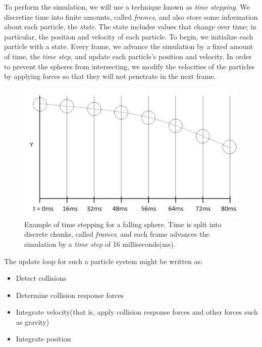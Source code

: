 \documentclass[]{article}
\begin{document}
	To perform the simulation, we will use a technique known as \textit{time stepping}. We discretize time into finite 
	amounts, called \textit{frames}, and also store some information about each particle, the \textit{state}. The state
	includes values that change over time; in particular, the position and velocity of each particle. To begin, we initialize
	each particle with a state. Every frame, we advance the simulation by a fixed amount of time, the \textit{time step}, 
	and update each particle's position and velocity. In order to prevent the spheres from intersecting, we modify the
	velocities of the particles by applying forces so that they will not penetrate in the next frame.\\
	
	\begin{figure}[ht]
	  \centering
	  \includegraphics[width=6.0in]{images/TimeStepping}
	  \caption{Example of time stepping for a falling sphere. Time is split into discrete chunks, called \textit{frames},
	  and each frame advances the simulation by a \textit{time step} of 16 milliseconds(ms).}
	\end{figure}
	
	The update loop for such a particle system might be written as:
	\begin{itemize}
		\item Detect collisions
		\item Determine collision response forces
		\item Integrate velocity(that is, apply collision response forces and other forces such as gravity)
		\item Integrate position
	\end{itemize}
	
\end{document}
